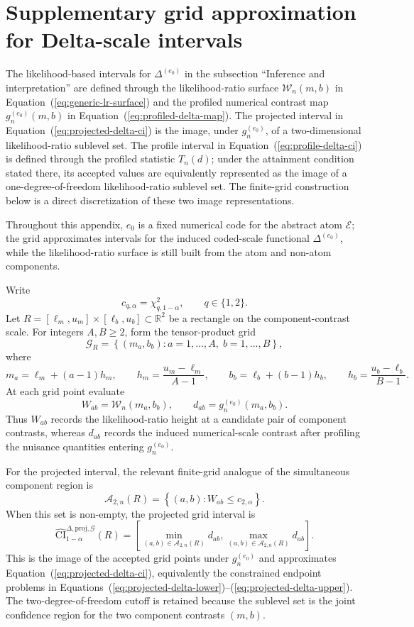 \documentclass[11pt]{article}
\begin{document}
\section{Supplementary grid approximation for Delta-scale intervals}
\label{app:supplementary-delta-intervals}

The likelihood-based intervals for $\Delta^{(e_0)}$ in the subsection ``Inference and interpretation'' are defined through the likelihood-ratio surface $\mathcal{W}_n(m,b)$ in Equation~(\ref{eq:generic-lr-surface}) and the profiled numerical contrast map $g_n^{(e_0)}(m,b)$ in Equation~(\ref{eq:profiled-delta-map}). The projected interval in Equation~(\ref{eq:projected-delta-ci}) is the image, under $g_n^{(e_0)}$, of a two-dimensional likelihood-ratio sublevel set. The profile interval in Equation~(\ref{eq:profile-delta-ci}) is defined through the profiled statistic $T_n(d)$; under the attainment condition stated there, its accepted values are equivalently represented as the image of a one-degree-of-freedom likelihood-ratio sublevel set. The finite-grid construction below is a direct discretization of these two image representations.

Throughout this appendix, $e_0$ is a fixed numerical code for the abstract atom $\mathcal E$; the grid approximates intervals for the induced coded-scale functional $\Delta^{(e_0)}$, while the likelihood-ratio surface is still built from the atom and non-atom components.

Write
\[
  c_{q,\alpha}=\chi^2_{q,1-\alpha},
  \qquad q\in\{1,2\}.
\]
Let $R=[\ell_m,u_m]\times[\ell_b,u_b]\subset\mathbb{R}^2$ be a rectangle on the component-contrast scale. For integers $A,B\geq2$, form the tensor-product grid
\[
  \mathcal{G}_{R}
  =
  \left\{
    (m_a,b_b):
    a=1,\ldots,A,\;
    b=1,\ldots,B
  \right\},
\]
where
\[
  m_a=\ell_m+(a-1)h_m,
  \qquad
  h_m=\frac{u_m-\ell_m}{A-1},
  \qquad
  b_b=\ell_b+(b-1)h_b,
  \qquad
  h_b=\frac{u_b-\ell_b}{B-1}.
\]
At each grid point evaluate
\[
  W_{ab}=\mathcal{W}_n(m_a,b_b),
  \qquad
  d_{ab}=g_n^{(e_0)}(m_a,b_b).
\]
Thus $W_{ab}$ records the likelihood-ratio height at a candidate pair of component contrasts, whereas $d_{ab}$ records the induced numerical-scale contrast after profiling the nuisance quantities entering $g_n^{(e_0)}$.

For the projected interval, the relevant finite-grid analogue of the simultaneous component region is
\[
  \mathcal{A}_{2,n}(R)
  =
  \left\{
    (a,b):
    W_{ab}\leq c_{2,\alpha}
  \right\}.
\]
When this set is non-empty, the projected grid interval is
\[
  \widehat{\mathrm{CI}}^{\Delta,\mathrm{proj},\mathcal{G}}_{1-\alpha}(R)
  =
  \left[
    \min_{(a,b)\in\mathcal{A}_{2,n}(R)} d_{ab},
    \max_{(a,b)\in\mathcal{A}_{2,n}(R)} d_{ab}
  \right].
\]
This is the image of the accepted grid points under $g_n^{(e_0)}$ and approximates Equation~(\ref{eq:projected-delta-ci}), equivalently the constrained endpoint problems in Equations~(\ref{eq:projected-delta-lower})--(\ref{eq:projected-delta-upper}). The two-degree-of-freedom cutoff is retained because the sublevel set is the joint confidence region for the two component contrasts $(m,b)$.
\end{document}
